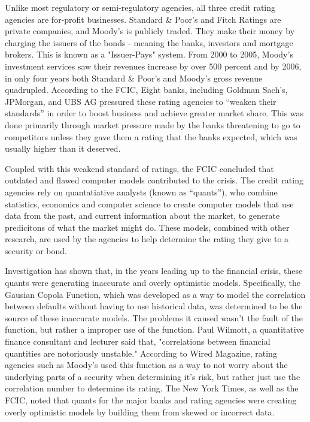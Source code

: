 \documentclass[11pt]{article}
\begin{document}
\begin{multicols}{2}
Unlike most regulatory or semi-regulatory agencies, all three credit rating agencies are for-profit businesses.  Standard \& Poor's and Fitch Ratings are private companies, and Moody's is publicly traded.  They make their money by charging the issuers of the bonds - meaning the banks, investors and mortgage brokers. This is known as a "Issuer-Pays" system. \cite{gatekeepers} From 2000 to 2005, Moody's investment services saw their revenues increase by over 500 percent\cite{gatekeepers} and by 2006, in only four years both Standard \& Poor's and Moody's gross revenue quadrupled.  According to the FCIC, Eight banks, including Goldman Sach's, JPMorgan, and UBS AG pressured these rating agencies to ``weaken their standards'' in order to boost business and achieve greater market share. \cite{ratingEthics} This was done primarily through market pressure made by the banks threatening to go to competitors unless they gave them a rating that the banks expected, which was usually higher than it deserved.  

Coupled with this weakend standard of ratings, the FCIC concluded that outdated and flawed computer models contributed to the crisis. \cite[p.~xxv]{govtReport} The credit rating agencies rely on quantatiative analysts (known as ``quants''), who combine statistics, economics and computer science to create computer models that use data from the past, and current information about the market, to generate predicitons of what the market might do. \cite{quantsRole} These models, combined with other research, are used by the agencies to help determine the rating they give to a security or bond.

Investigation has shown that, in the years leading up to the financial crisis, these quants were generating inaccurate and overly optimistic models. Specifically, the Gausian Copola Function, which was developed as a way to model the correlation between defaults without having to use historical data, was determined to be the source of these inaccurate models. \cite{wiredFormula} The problems it caused wasn't the fault of the function, but rather a improper use of the function.  Paul Wilmott, a quantitative finance consultant and lecturer said that, "correlations between financial quantities are notoriously unstable." \cite{wiredFormula} According to Wired Magazine, rating agencies such as Moody's used this function as a way to not worry about the underlying parts of a security when determining it's risk, but rather just use the correlation number to determine its rating.  The New York Times, as well as the FCIC, noted that quants for the major banks and rating agencies were creating overly optimistic models by building them from skewed or incorrect data. \cite{nyTimesQuants, govtReport}


\end{multicols}
\end{document}
